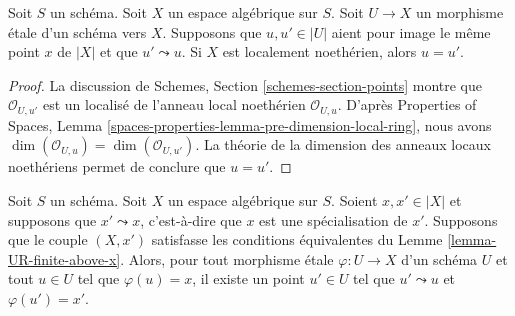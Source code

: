 \begin{lemma}
\label{lemma-no-specializations-map-to-same-point-Noetherian}
Soit $S$ un schéma. Soit $X$ un espace algébrique sur $S$.
Soit $U \to X$ un morphisme étale d'un schéma vers $X$.
Supposons que $u, u' \in |U|$ aient pour image le même point $x$ de $|X|$ et
que $u' \leadsto u$. Si $X$ est localement noethérien, alors $u = u'$.
\end{lemma}

\begin{proof}
La discussion de Schemes, Section \ref{schemes-section-points}
montre que $\mathcal{O}_{U, u'}$ est un localisé de
l'anneau local noethérien $\mathcal{O}_{U, u}$.
D'après Properties of Spaces, Lemma
\ref{spaces-properties-lemma-pre-dimension-local-ring},
nous avons $\dim(\mathcal{O}_{U, u}) = \dim(\mathcal{O}_{U, u'})$.
La théorie de la dimension des anneaux locaux noethériens permet de conclure
que $u = u'$.
\end{proof}

\begin{lemma}
\label{lemma-specialization}
Soit $S$ un schéma.
Soit $X$ un espace algébrique sur $S$.
Soient $x, x' \in |X|$ et supposons que $x' \leadsto x$, c'est-à-dire que $x$
est une spécialisation de $x'$.
Supposons que le couple $(X, x')$ satisfasse les conditions équivalentes
du Lemme \ref{lemma-UR-finite-above-x}.
Alors, pour tout morphisme étale $\varphi : U \to X$ d'un schéma $U$ et tout
$u \in U$ tel que $\varphi(u) = x$, il existe un point $u'\in U$ tel que
$u' \leadsto u$ et $\varphi(u') = x'$.
\end{lemma}

